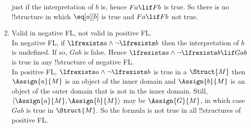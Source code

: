 \documentclass[../../../include/open-logic-section]{subfiles}
\begin{document}
\begin{prob}
\begin{ans}
\begin{enumerate}
	just if the interpretation of $b$ is, hence $Fa \lif Fb$ is true.
	So there is no !!{structure} in which $\eq[a][b]$ is true and $Fa
	\lif Fb$ not true.
\item Valid in negative FL, not valid in positive FL.\\
	In negative FL, if $\lfrexists a \land \lnot \lfrexists b$ then
	the interpretation of $b$ is undefined. If so, $Gab$ is false.
	Hence $\lfrexists a \land \lnot \lfrexists b \lif Gab$ is true in
	any !!{structure} of negative FL.\\
	In positive FL, $\lfrexists a \land \lnot \lfrexists b$ is true in
	a $\Struct{M}$ then $\Assign{a}{M}$ is an object of the inner
	domain and $\Assign{b}{M}$ is an object of the outer domain that
	is not in the inner domain. Still, $\langle
	\Assign{a}{M},\Assign{b}{M} \rangle$ may be $\Assign{G}{M}$, in
	which case $Gab$ is true in $\Struct{M}$. So the formula is not
	true in all !!{structure}s of positive FL.
\end{enumerate}
\end{ans}
\end{prob}
\end{document}
